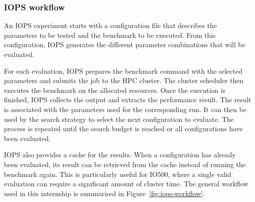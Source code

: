 

\subsubsection{IOPS workflow}

An IOPS experiment starts with a configuration file that describes the
parameters to be tested and the benchmark to be executed. From this
configuration, IOPS generates the different parameter combinations that
will be evaluated.

For each evaluation, IOPS prepares the benchmark command with the selected
parameters and submits the job to the HPC cluster. The cluster scheduler
then executes the benchmark on the allocated resources. Once the execution
is finished, IOPS collects the output and extracts the performance result. The result is associated with the parameters used for the corresponding
run. It can then be used by the search strategy to select the next
configuration to evaluate. The process is repeated until the search budget
is reached or all configurations have been evaluated.

IOPS also provides a cache for the results. When a configuration has
already been evaluated, its result can be retrieved from the cache instead
of running the benchmark again. This is particularly useful for IO500,
where a single valid evaluation can require a significant amount of
cluster time. The general workflow used in this internship is summarised
in Figure~\ref{fig:iops-workflow}.

